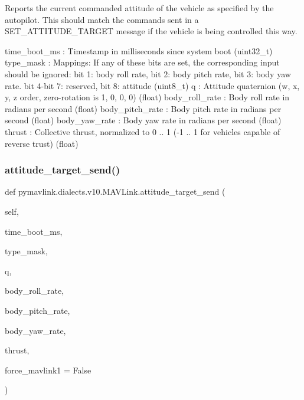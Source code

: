 \begin{DoxyVerb}Reports the current commanded attitude of the vehicle as specified by
the autopilot. This should match the commands sent in
a SET_ATTITUDE_TARGET message if the vehicle is being
controlled this way.

time_boot_ms              : Timestamp in milliseconds since system boot (uint32_t)
type_mask                 : Mappings: If any of these bits are set, the corresponding input should be ignored: bit 1: body roll rate, bit 2: body pitch rate, bit 3: body yaw rate. bit 4-bit 7: reserved, bit 8: attitude (uint8_t)
q                         : Attitude quaternion (w, x, y, z order, zero-rotation is 1, 0, 0, 0) (float)
body_roll_rate            : Body roll rate in radians per second (float)
body_pitch_rate           : Body pitch rate in radians per second (float)
body_yaw_rate             : Body yaw rate in radians per second (float)
thrust                    : Collective thrust, normalized to 0 .. 1 (-1 .. 1 for vehicles capable of reverse trust) (float)\end{DoxyVerb}
 \mbox{\label{classpymavlink_1_1dialects_1_1v10_1_1MAVLink_afcc79f0f274531eb0d3948116004d625}} 
\subsubsection{\texorpdfstring{attitude\+\_\+target\+\_\+send()}{attitude\_target\_send()}}
{\footnotesize\ttfamily def pymavlink.\+dialects.\+v10.\+M\+A\+V\+Link.\+attitude\+\_\+target\+\_\+send (\begin{DoxyParamCaption}\item[{}]{self,  }\item[{}]{time\+\_\+boot\+\_\+ms,  }\item[{}]{type\+\_\+mask,  }\item[{}]{q,  }\item[{}]{body\+\_\+roll\+\_\+rate,  }\item[{}]{body\+\_\+pitch\+\_\+rate,  }\item[{}]{body\+\_\+yaw\+\_\+rate,  }\item[{}]{thrust,  }\item[{}]{force\+\_\+mavlink1 = {\ttfamily False} }\end{DoxyParamCaption})}

